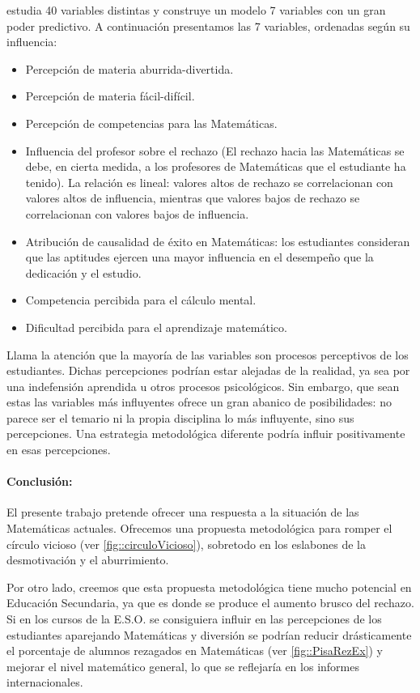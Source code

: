 \cite{ActitudesHaciaMates} estudia 40 variables distintas y construye un modelo 7 variables con un gran poder predictivo.
%
A continuación presentamos las 7 variables, ordenadas según su influencia: 
%
\begin{itemize}
\vspace{-0.4cm}\item Percepción de materia aburrida-divertida.
\vspace{-0.4cm}\item Percepción de materia fácil-difícil.
\vspace{-0.4cm}\item Percepción de competencias para las Matemáticas.
\vspace{-0.4cm}\item Influencia del profesor sobre el rechazo (El rechazo hacia las Matemáticas se debe, en cierta medida, a los profesores de Matemáticas que el estudiante ha tenido). La relación es lineal: valores altos de rechazo se correlacionan con valores altos de influencia, mientras que valores bajos de rechazo se correlacionan con valores bajos de influencia.
\vspace{-0.4cm}\item Atribución de causalidad de éxito en Matemáticas: los estudiantes consideran que las aptitudes ejercen una mayor influencia en el desempeño que la dedicación y el estudio.
\vspace{-0.4cm}\item Competencia percibida para el cálculo mental.
\vspace{-0.4cm}\item Dificultad percibida para el aprendizaje matemático.
\end{itemize}

Llama la atención que la mayoría de las variables son procesos perceptivos de los estudiantes.
%
Dichas percepciones podrían estar alejadas de la realidad, ya sea por una indefensión aprendida u otros procesos psicológicos.
%
Sin embargo, que sean estas las variables más influyentes ofrece un gran abanico de posibilidades: no parece ser el temario ni la propia disciplina lo más influyente, sino sus percepciones.
%
Una estrategia metodológica diferente podría influir positivamente en esas percepciones.

\paragraph{Conclusión:} El presente trabajo pretende ofrecer una respuesta a la situación de las Matemáticas actuales.
%
Ofrecemos una propuesta metodológica para romper el círculo vicioso (ver \ref{fig::circuloVicioso}), sobretodo en los eslabones de la desmotivación y el aburrimiento.

Por otro lado, creemos que esta propuesta metodológica tiene mucho potencial en Educación Secundaria, ya que es donde se produce el aumento brusco del rechazo.
%
Si en los cursos de la E.S.O. se consiguiera influir en las percepciones de los estudiantes aparejando Matemáticas y diversión se podrían reducir drásticamente el porcentaje de alumnos rezagados en Matemáticas (ver \ref{fig::PisaRezEx}) y mejorar el nivel matemático general, lo que se reflejaría en los informes internacionales.

